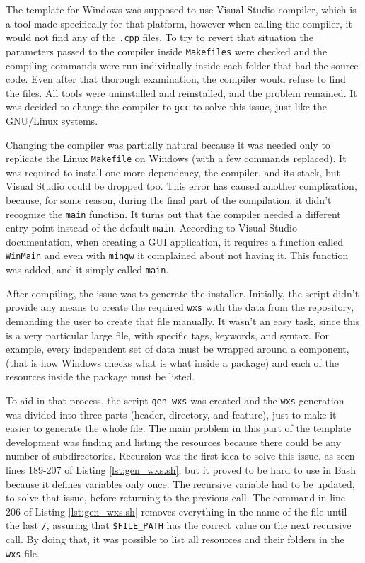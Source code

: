The template for Windows was supposed to use Visual Studio compiler, which is a tool made specifically for that platform, however when calling the compiler, it would not find any of the \texttt{.cpp} files. To try to revert that situation the parameters passed to the compiler inside \texttt{Makefiles} were checked and the compiling commands were run individually inside each folder that had the source code. Even after that thorough examination, the compiler would refuse to find the files. All tools were uninstalled and reinstalled, and the problem remained. It was decided to change the compiler to \texttt{gcc} to solve this issue, just like the GNU/Linux systems.

Changing the compiler was partially natural because it was needed only to replicate the Linux \texttt{Makefile} on Windows (with a few commands replaced). It was required to install one more dependency, the compiler, and its stack, but Visual Studio could be dropped too. This error has caused another complication, because, for some reason, during the final part of the compilation, it didn't recognize the \texttt{main} function. It turns out that the compiler needed a different entry point instead of the default \texttt{main}. According to Visual Studio documentation, when creating a GUI application, it requires a function called \texttt{WinMain} \cite{visualstudio2017entrypoint} and even with \texttt{mingw} it complained about not having it. This function was added, and it simply called \texttt{main}.

After compiling, the issue was to generate the installer. Initially, the script didn't provide any means to create the required \texttt{wxs} with the data from the repository, demanding the user to create that file manually. It wasn't an easy task, since this is a very particular large file, with specific tags, keywords, and syntax. For example, every independent set of data must be wrapped around a component, (that is how Windows checks what is what inside a package) and each of the resources inside the package must be listed.

To aid in that process, the script \texttt{gen\_wxs} was created and the \texttt{wxs} generation was divided into three parts (header, directory, and feature), just to make it easier to generate the whole file. The main problem in this part of the template development was finding and listing the resources because there could be any number of subdirectories. Recursion was the first idea to solve this issue, as seen lines 189-207 of Listing \ref{lst:gen_wxs.sh}, but it proved to be hard to use in Bash because it defines variables only once. The recursive variable had to be updated, to solve that issue, before returning to the previous call. The command in line 206 of Listing \ref{lst:gen_wxs.sh} removes everything in the name of the file until the last \texttt{/}, assuring that \texttt{\$FILE\_PATH} has the correct value on the next recursive call. By doing that, it was possible to list all resources and their folders in the \texttt{wxs} file.

